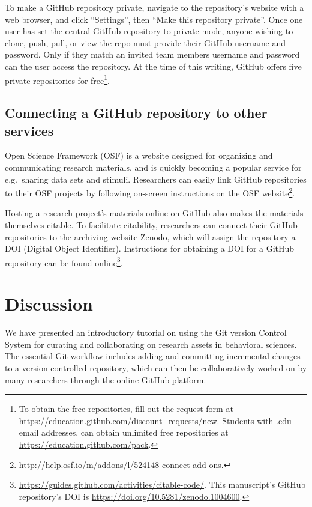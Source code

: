 \documentclass[
  american,
  ,doc,floatsintext]{apa6}
\begin{document}
To make a GitHub repository private, navigate to the repository's website with a web browser, and click \enquote{Settings}, then \enquote{Make this repository private}. Once one user has set the central GitHub repository to private mode, anyone wishing to clone, push, pull, or view the repo must provide their GitHub username and password. Only if they match an invited team members username and password can the user access the repository. At the time of this writing, GitHub offers five private repositories for free\footnote{To obtain the free repositories, fill out the request form at \url{https://education.github.com/discount_requests/new}. Students with .edu email addresses, can obtain unlimited free repositories at \url{https://education.github.com/pack}.}.

\hypertarget{connecting-a-github-repository-to-other-services}{%
\subsection{Connecting a GitHub repository to other services}\label{connecting-a-github-repository-to-other-services}}

Open Science Framework (OSF) is a website designed for organizing and communicating research materials, and is quickly becoming a popular service for e.g.~sharing data sets and stimuli. Researchers can easily link GitHub repositories to their OSF projects by following on-screen instructions on the OSF website\footnote{\url{http://help.osf.io/m/addons/l/524148-connect-add-ons}.}.

Hosting a research project's materials online on GitHub also makes the materials themselves citable. To facilitate citability, researchers can connect their GitHub repositories to the archiving website Zenodo, which will assign the repository a DOI (Digital Object Identifier). Instructions for obtaining a DOI for a GitHub repository can be found online\footnote{\url{https://guides.github.com/activities/citable-code/}. This manuscript's GitHub repository's DOI is \url{https://doi.org/10.5281/zenodo.1004600}.}.

\hypertarget{discussion}{%
\section{Discussion}\label{discussion}}

We have presented an introductory tutorial on using the Git version Control System for curating and collaborating on research assets in behavioral sciences. The essential Git workflow includes adding and committing incremental changes to a version controlled repository, which can then be collaboratively worked on by many researchers through the online GitHub platform.
\end{document}
